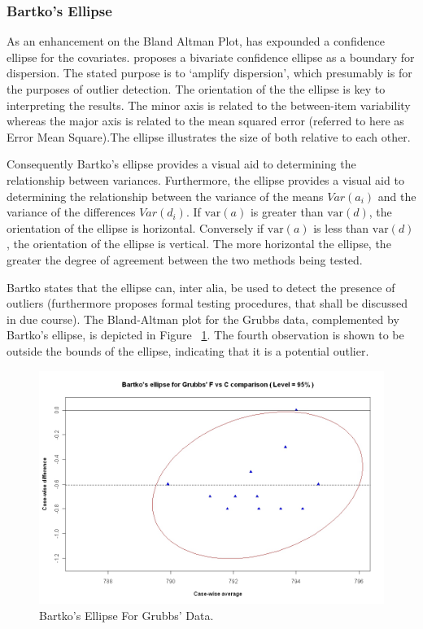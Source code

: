 \documentclass[Main.tex]{subfiles}
\begin{document}
\subsubsection{Bartko's Ellipse}
	
As an enhancement on the Bland Altman Plot, \citet{Bartko} has expounded a confidence ellipse for the covariates. \citet{Bartko} proposes
a bivariate confidence ellipse as a boundary for dispersion. The stated purpose is to `amplify dispersion', which presumably is for  the purposes of outlier detection. The orientation of the the ellipse is key to interpreting the results. The minor axis is related to the between-item variability whereas the major axis is related to the mean squared error (referred to here as Error Mean Square).The ellipse illustrates the size of both relative to each other. 
	
	
Consequently Bartko's ellipse provides a visual aid to determining the relationship between variances. Furthermore, the ellipse provides a visual aid to determining the relationship	between the variance of the means $Var(a_{i})$ and the variance of the differences $Var(d_{i})$. If $\mbox{var}(a)$ is greater than $\mbox{var}(d)$, the orientation of the ellipse is horizontal. Conversely if $\mbox{var}(a)$ is less than $\mbox{var}(d)$, the orientation of the ellipse is vertical. The more horizontal the ellipse, the greater the degree of agreement between the two methods being tested.
	
Bartko states that the ellipse can, inter alia, be used to detect the presence of outliers (furthermore \citet{Bartko} proposes formal testing procedures, that shall be discussed in due course). The Bland-Altman plot for the Grubbs data, complemented by Bartko's ellipse, is depicted in Figure ~\ref{GrubbsBartko1}. The fourth observation is shown to be outside the bounds of the ellipse, indicating that it is a potential outlier.
	
	
	\begin{centering}
		\begin{figure}[h!]
			\includegraphics[width=130mm]{images/GrubbsBartko.jpeg}
			\caption{Bartko's Ellipse For Grubbs' Data.}
			\label{GrubbsBartko1}
		\end{figure}
	\end{centering}
	
\end{document}
